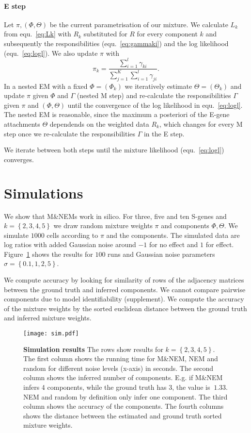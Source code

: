 \documentclass[12pt]{article}
\begin{document}
\paragraph{E step}
Let $\pi, (\Phi, \Theta)$ be the current parametrisation of our mixture. We calculate $L_k$ from equ.~\eqref{eq:Lk} with $R_k$ substituted for $R$ for every component $k$ and subsequently the responsibilities (equ.~\eqref{eq:gammaki}) and the log likelihood (equ.~\eqref{eq:logl}). We also update $\pi$ with
\begin{equation*}
\pi_k = \frac{\sum\limits_{i=1}^l \gamma_{ki}}{\sum\limits_{j=1}^K\sum\limits_{i=1}^l \gamma_{ji}}.
\end{equation*}
In a nested EM with a fixed $\Phi = (\Phi_k)$ we iteratively estimate $\Theta = (\Theta_k)$ and update $\pi$ given $\Phi$ and $\Gamma$ (nested M step) and re-calculate the responsibilities $\Gamma$ given $\pi$ and $(\Phi, \Theta)$ until the convergence of the log likelihood in equ.~\eqref{eq:logl}. The nested EM is reasonable, since the maximum a posteriori of the E-gene attachments $\Theta$ dependends on the weighted data $R_k$, which changes for every M step once we re-calculate the responsibilities $\Gamma$ in the E step.

We iterate between both steps until the mixture likelihood (equ.~\eqref{eq:logl}) converges.

\section{Simulations}
We show that M\&NEMs work in silico. For three, five and ten S-genes and $k=\left\{2,3,4,5\right\}$ we draw random mixture weights $\pi$ and components $\Phi, \Theta$. We simulate $1000$ cells according to $\pi$ and the components. The simulated data are log ratios with added Gaussian noise around $-1$ for no effect and $1$ for effect. Figure~\ref{fig:sim} shows the results for $100$ runs and Gaussian noise parameters $\sigma = \left\{0.1, 1, 2, 5\right\}$.

We compute accuracy by looking for similarity of rows of the adjacency matrices between the ground truth and inferred components. We cannot compare pairwise components due to model identifiability (supplement). We compute the accuracy of the mixture weights by the sorted euclidean distance between the ground truth and inferred mixture weights.

\begin{figure}
\texttt{[image: sim.pdf]}
\caption{\textbf{Simulation results} The rows show results for $k=\left\{2,3,4,5\right\}$. The first column shows the running time for M\&NEM, NEM and random for different noise levels (x-axis) in seconds. The second column shows the inferred number of components. E.g. if M\&NEM infers 4 components, while the ground truth has 3, the value is $~1.33$. NEM and random by definition only infer one component. The third column shows the accuracy of the components. The fourth columns shows the distance between the estimated and ground truth sorted mixture weights.}\label{fig:sim}
\end{figure}
\end{document}
